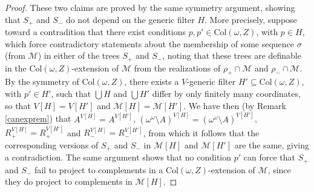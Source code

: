 \documentclass[fleqn, 11pt]{amsart}
\theoremstyle{plain}
\theoremstyle{definition}
\theoremstyle{remark}
\newcommand{\Col}{\mathrm{Col}}
\DeclareMathOperator{\p}{p}
\begin{document}
\begin{proof}
	These two claims are proved by the same symmetry argument, showing that $S_{+}$ and $S_{-}$ do not depend on the generic filter $H$. More precisely, suppose toward a contradition that there exist conditions $p, p' \in \Col(\omega, Z)$, with $p \in H$, which force contradictory statements about the membership of some sequence $\sigma$ (from $\mathcal{M}$) in either of the trees $S_{+}$ and $S_{-}$, noting that these trees are definable in the $\Col(\omega, Z)$-extension of $\mathcal{M}$ from the realizations of $\rho_{+} \cap \mathcal{M}$ and $\rho_{-} \cap \mathcal{M}$. By the symmetry of $\Col(\omega, Z)$, there exists a $V$-generic filter $H' \subseteq \Col(\omega, Z)$, with $p' \in H'$, such that $\bigcup H$ and $\bigcup H'$ differ by only finitely many coordinates, so that $V[H] = V[H']$ and $\mathcal{M}[H] = \mathcal{M}[H']$. 
	We have then (by Remark \ref{canexprem}) that $A^{V[H]} = A^{V[H']}$, $(\omega^{\omega} \setminus A)^{V[H]} = (\omega^{\omega} \setminus A)^{V[H']}$, $R_{+}^{V[H]} = R_{+}^{V[H']}$ and $R_{-}^{V[H]} = R_{-}^{V[H']}$, from which it follows that the corresponding versions of $S_{+}$ and $S_{-}$ in $\mathcal{M}[H]$ and $\mathcal{M}[H']$ are the same, giving a contradiction. The same argument shows that no condition $p'$ can force that $S_{+}$ and $S_{-}$ fail to project to complements in a $\Col(\omega, Z)$-extension of $\mathcal{M}$, since they do project to complements in $\mathcal{M}[H]$. 
	\end{proof}
	
	
\end{document}
